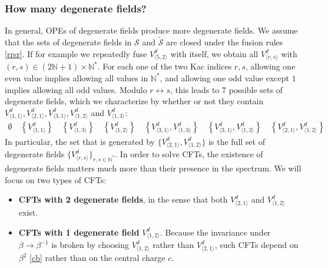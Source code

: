\documentclass[12pt, a4paper]{article}
\theoremstyle{break}
\begin{document}
\subsubsection{How many degenerate fields?}\label{sec:hmdf}

In general, OPEs of degenerate fields produce more degenerate fields. We assume that the sets of degenerate fields in $\mathcal{S}$ and $\widetilde{\mathcal{S}}$ are closed under the fusion rules \eqref{rrsr}. If for example we repeatedly fuse $V^d_{\langle 5,2\rangle}$ with itself, we obtain all $V^d_{\langle r,s\rangle}$ with $(r,s)\in (2\mathbb{N}+1)\times \mathbb{N}^*$. For each one of the two Kac indices $r,s$, allowing one even value implies allowing all values in $\mathbb{N}^*$, and allowing one odd value except $1$ implies allowing all odd values. Modulo $r\leftrightarrow s$, this leads to 7 possible sets of degenerate fields, which we characterize by whether or not they contain $V^d_{\langle 1,1\rangle}, V^d_{\langle 2,1\rangle},V^d_{\langle 3,1\rangle},V^d_{\langle 1,2\rangle}$ and $V^d_{\langle 1,3\rangle}$:
\begin{align}
  \emptyset \quad \left\{V^d_{\langle 1,1\rangle}\right\}  \quad \left\{V^d_{\langle 1,3\rangle}\right\} \quad \left\{V^d_{\langle 1,2\rangle}\right\} 
  \quad 
  \left\{V^d_{\langle 3,1\rangle},V^d_{\langle 1,3\rangle}\right\} \quad 
  \left\{V^d_{\langle 3,1\rangle},V^d_{\langle 1,2\rangle}\right\} \quad 
  \left\{V^d_{\langle 2,1\rangle},V^d_{\langle 1,2\rangle}\right\} 
 \label{degsets}
\end{align}
In particular, the set that is generated by $\{V^d_{\langle 2,1\rangle},V^d_{\langle 1,2\rangle}\} $ is the full set of degenerate fields $\{V^d_{\langle r,s\rangle}\}_{r,s\in\mathbb{N}^*}$. 
In order to solve CFTs, the existence of degenerate fields matters much more than their presence in the spectrum. We will focus on two types of CFTs:
\begin{itemize}
 \item \textbf{CFTs with 2 degenerate fields}, in the sense that both $V^d_{\langle 2,1\rangle}$ and $V^d_{\langle 1,2\rangle}$ exist. 
 \item \textbf{CFTs with 1 degenerate field} $V^d_{\langle 1,2\rangle}$. Because the invariance under $\beta\to \beta^{-1}$ is broken by choosing $V^d_{\langle 1,2\rangle}$ rather than $V^d_{\langle 2,1\rangle}$, such CFTs depend on $\beta^2$ \eqref{cb} rather than on the central charge $c$. 
\end{itemize}
\end{document}
